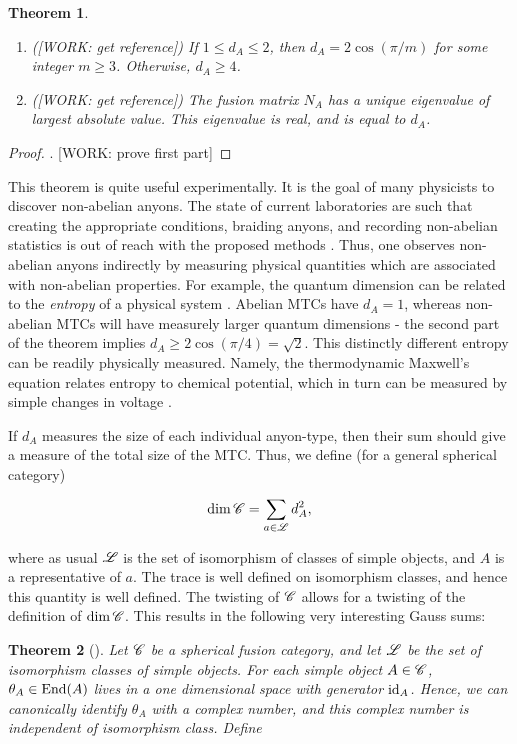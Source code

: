 \documentclass{article}
\newtheorem{theorem}{Theorem}[section]
\theoremstyle{definition}
\numberwithin{figure}{section}
\begin{document}
\begin{enumerate}[\thesection .1.]
\begin{theorem}
\begin{enumerate}
\item ([WORK: get reference]) If $1\leq d_A\leq 2$, then $d_A=2\cos(\pi /m)$ for some integer $m\geq 3$. Otherwise, $d_A\geq 4$.

\item ([WORK: get reference]) The fusion matrix $N_A$ has a unique eigenvalue of largest absolute value. This eigenvalue is real, and is equal to $d_A$.
\end{enumerate}
\end{theorem}
\begin{proof}. [WORK: prove first part]
\end{proof}

This theorem is quite useful experimentally. It is the goal of many physicists to discover non-abelian anyons. The state of current laboratories are such that creating the appropriate conditions, braiding anyons, and recording non-abelian statistics is out of reach with the proposed methods \cite{bonderson2006probing}. Thus, one observes non-abelian anyons indirectly by measuring physical quantities which are associated with non-abelian properties. For example, the quantum dimension can be related to the \textit{entropy} of a physical system \cite{kitaev2006topological}. Abelian MTCs have $d_A=1$, whereas non-abelian MTCs will have measurely larger quantum dimensions - the second part of the theorem implies $d_A\geq 2\cos(\pi/4)=\sqrt{2}$. This distinctly different entropy can be readily physically measured. Namely, the thermodynamic Maxwell's equation relates entropy to chemical potential, which in turn can be measured by simple changes in voltage \cite{cooper2009observable}.

If $d_A$ measures the size of each individual anyon-type, then their sum should give a measure of the total size of the MTC. Thus, we define (for a general spherical category)

$$\dim \mathscr{C} = \sum_{a\in \mathscr{L}} d_A^2,$$

where as usual $\mathscr{L}$ is the set of isomorphism of classes of simple objects, and $A$ is a representative of $a$. The trace is well defined on isomorphism classes, and hence this quantity is well defined. The twisting of $\mathscr{C}$ allows for a twisting of the definition of $\dim \mathscr{C}$. This results in the following very interesting Gauss sums:

\begin{theorem}[\cite{vafa1988toward}] Let $\mathscr{C}$ be a spherical fusion category, and let $\mathscr{L}$ be the set of isomorphism classes of simple objects. For each simple object $A\in \mathscr{C}$, $\theta_A\in \mathrm{End}(A)$ lives in a one dimensional space with generator $\mathrm{id}_A$. Hence, we can canonically identify $\theta_A$ with a complex number, and this complex number is independent of isomorphism class. Define


\end{theorem}
\end{enumerate}
\end{document}
